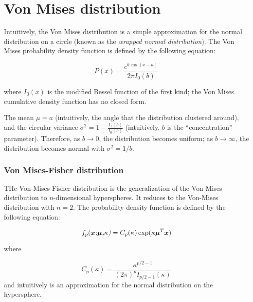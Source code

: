 \part*{Von Mises distribution}

Intuitively, the Von Mises distribution\cite{wolfram_von_mises} is
a simple approximation for the normal distribution on a circle (known
as the \textit{wrapped normal distribution}). The Von Mises probability
density function is defined by the following equation:

\[
P(x)=\frac{{e^{b\cos(x-a)}}}{2\pi I_{0}(b)}
\]


where $I_{0}(x)$ is the modified Bessel function of the first kind;
the Von Mises cumulative density function has no closed form.

The mean $\mu=a$ (intuitively, the angle that the distribution clustered
around), and the circular variance $\sigma^{2}=1-\frac{{I_{1}(b)}}{I_{0}(b)}$
(intuitively, $b$ is the ``concentration'' parameter). Therefore,
as $b\rightarrow0$, the distribution becomes uniform; as $b\rightarrow\infty$,
the distribution becomes normal with $\sigma^{2}=1/b$.


\section*{Von Mises-Fisher distribution}

THe Von-Mises Fisher distribution is the generalization of the Von
Mises distribution to $n$-dimensional hyperspheres. It reduces to
the Von-Mises distribution with $n=2$. The probability density function
is defined by the following equation:

\[
f_{p}(\emph{\ensuremath{\boldsymbol{x}};\ensuremath{\boldsymbol{\mu}},\ensuremath{\kappa})}=C_{p}(\kappa)\exp(\kappa\boldsymbol{\mu}^{T}\boldsymbol{x})
\]


where

\[
C_{p}(\kappa)=\frac{\kappa^{p/2-1}}{(2\pi)^{p}I_{p/2-1}(\kappa)}
\]
 and intuitively is an approximation for the normal distribution on
the hypersphere.